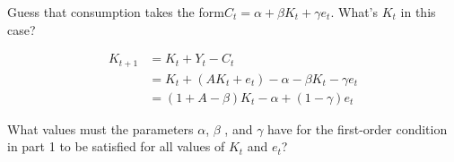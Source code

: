 \begin{problem}[2]
    Guess that consumption takes the form$ C_t = \alpha  + \beta K_t + \gamma e_t$. What's $K_t$ in this case?
\end{problem}

\begin{solution}
    \begin{align*}
        K_{t+1} &= K_t + Y_t - C_t \\
        &= K_t + (A K_t + e_t) - \alpha - \beta K_t - \gamma e_t \\
        &= (1+A-\beta) K_t - \alpha + (1-\gamma) e_t
    \end{align*}
\end{solution}

\begin{problem}[3]
    What values must the parameters $\alpha $, $\beta$ , and $\gamma$ have for the first-order condition in part 1 to be
satisfied for all values of $K_t$ and $e_t$?
\end{problem}

